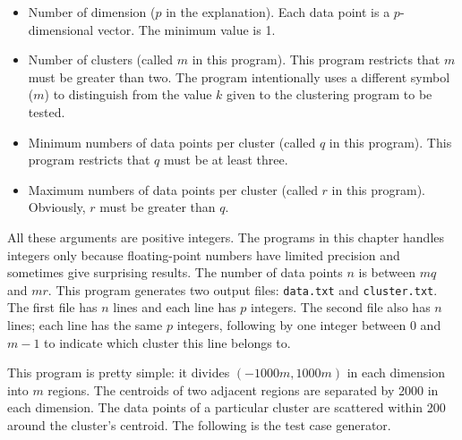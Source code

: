 \begin{itemize}
\item Number of dimension ($p$ in the explanation).  Each data point
  is a $p$-dimensional vector. The minimum value is 1.

\item Number of clusters (called $m$ in this program).  This program
  restricts that $m$ must be greater than two.  The program
  intentionally uses a different symbol ($m$) to distinguish from the
  value $k$ given to the clustering program to be tested.

\item Minimum numbers of data points per cluster (called $q$ in this
  program).  This program restricts that $q$ must be at least three.

\item Maximum numbers of data points per cluster (called $r$ in this
  program). Obviously, $r$ must be greater than $q$.

\end{itemize}  

All these arguments are positive integers.  The programs in this
chapter handles integers only because floating-point numbers have
limited precision and sometimes give surprising results.  The number of
data points $n$ is between $m q$ and $m r$.
  This program
generates two output files: {\tt data.txt} and {\tt cluster.txt}.  The
first file has $n$ lines and each line has $p$ integers.  The second
file also has $n$ lines; each line has the same $p$ integers,
following by one integer between $0$ and $m - 1$ to indicate which
cluster this line belongs to.

This program is pretty simple: it divides $(-1000m, 1000m)$ in each
dimension into $m$ regions. The centroids of two adjacent regions are
separated by 2000 in each dimension.  The data points of a particular
cluster are scattered within 200 around the cluster's centroid.  The
following is the test case generator.

\resetlinenumber[1]
\linenumbers
\begin{tt}
  
\end{tt}
\nolinenumbers

\resetlinenumber[1]
\linenumbers
\begin{tt}
  
\end{tt}
\nolinenumbers

